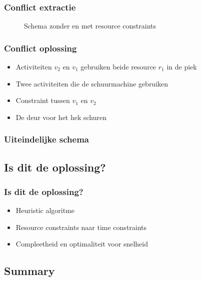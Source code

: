 \documentclass{beamer}
\theoremstyle{definition}
\newcommand{\inputtikz}[1]{}
\begin{document}
\begin{frame}
	\frametitle{Conflict extractie}
	\vspace{-1.2em}
	\begin{figure}[ht]
		\makebox[\textwidth][c]{\resizebox{.36\paperwidth}{!}{
			\inputtikz{schedule_infeasible_colored_profile_2}
		}}
		\vspace{-1.3em}
		\caption{Schema zonder en met resource constraints}
	\end{figure}
\end{frame}

\begin{frame}
	\frametitle{Conflict oplossing}
	\begin{itemize}
		\item Activiteiten $v_2$ en $v_1$ gebruiken beide resource $r_1$ in de piek
		\item Twee activiteiten die de schuurmachine gebruiken
		\item<2-> Constraint tussen $v_1$ en $v_2$
		\item<2-> De deur voor het hek schuren
	\end{itemize}
\end{frame}

\begin{frame}
	\frametitle{Uiteindelijke schema}
	\vspace{-0.2em}
	\begin{figure}[ht]
		\makebox[\textwidth][c]{\resizebox{.38\paperwidth}{!}{
			\inputtikz{schedule_feasible_profile}
		}}
		\label{fig:activity_graph}
	\end{figure}
\end{frame}

\subsection{Is dit de oplossing?}
\begin{frame}
	\frametitle{Is dit de oplossing?}
	\begin{itemize}
		\item Heuristic algoritme
		\item<2-> Resource constraints naar time constraints
		\item<3-> Compleetheid en optimaliteit voor snelheid
	\end{itemize}
\end{frame}
	

\subsection{Summary}
\end{document}
